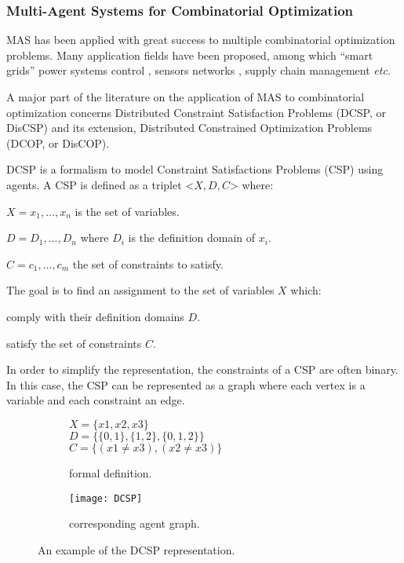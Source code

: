 \subsubsection{Multi-Agent Systems for Combinatorial Optimization}

MAS has been applied with great success to multiple combinatorial optimization problems. Many application fields have been proposed, among which \enquote{smart grids} power systems control \cite{RocheLauriBlunierMiraouiKoukam2013_561}, sensors networks \cite{Vinyals3589}, supply chain management \cite{Marik2011, Ka2011.6} \emph{etc.}

A major part of the literature on the application of MAS to combinatorial optimization concerns Distributed Constraint Satisfaction Problems (DCSP, or DisCSP) and its extension, Distributed Constrained Optimization Problems (DCOP, or DisCOP).

DCSP \cite{yokoo1998distributed} is a formalism to model Constraint Satisfactions Problems (CSP) using agents. A CSP is defined as a triplet <$X,D,C$> where:
\begin{compactitem}
\item $X = {x_1, ..., x_n}$ is the set of variables.
\item $D = {D_1, ..., D_n}$ where $D_i$ is the definition domain of $x_i$.
\item $C ={c_1, ..., c_m}$ the set of constraints to satisfy.
\end{compactitem}

The goal is to find an assignment to the set of variables $X$ which:
\begin{compactitem}
\item comply with their definition domains $D$.
\item satisfy the set of constraints $C$.
\end{compactitem}

In order to simplify the representation, the constraints of a CSP are often binary. In this case, the CSP can be represented as a graph where each vertex is a variable and each constraint an edge.

\begin{figure}[]
\centering
	\begin{subfigure}[b]{0.35\textwidth}
			$X = \{x1, x2, x3\}$\\
			$D = \{\{0,1\}, \{1,2\}, \{0,1,2\}\}$\\
			$C = \{(x1 \neq x3), (x2 \neq x3)\}$		
		\caption{formal definition.}
	\end{subfigure}
	\begin{subfigure}[b]{0.45\textwidth}
			\centering
			\texttt{[image: DCSP]}
			\caption{corresponding agent graph.}\label{dcsp:graph}
	\end{subfigure}

\caption{An example of the DCSP representation.}
\label{dcsp}

\end{figure}

